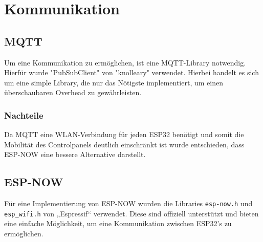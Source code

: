 \section{Kommunikation}
    \subsection{MQTT}
    Um eine Kommunikation zu ermöglichen, ist eine 
    MQTT-Library notwendig. Hierfür wurde "PubSubClient" von 
    "knolleary" verwendet. Hierbei handelt es sich um eine 
    simple Library, die nur das Nötigste implementiert, um
    einen überschaubaren Overhead zu gewährleisten.
        \subsubsection{Nachteile}
        Da MQTT eine WLAN-Verbindung für jeden ESP32
        benötigt und somit die Mobilität des Controlpanels
        deutlich einschränkt ist wurde entschieden, dass 
        ESP-NOW eine bessere Alternative darstellt.
    
    \subsection{ESP-NOW}
    Für eine Implementierung von ESP-NOW wurden die Libraries
    \texttt{esp-now.h} und \texttt{esp\_wifi.h} von
    „Espressif“ verwendet. Diese sind offiziell unterstützt
    und bieten eine einfache Möglichkeit, um eine Kommunikation
    zwischen ESP32's zu ermöglichen.